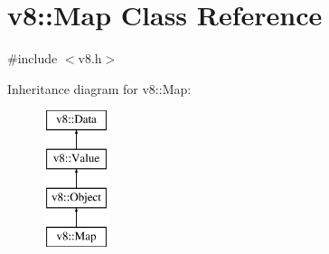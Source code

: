 \hypertarget{classv8_1_1Map}{}\section{v8\+:\+:Map Class Reference}
\label{classv8_1_1Map}


{\ttfamily \#include $<$v8.\+h$>$}

Inheritance diagram for v8\+:\+:Map\+:\begin{figure}[H]
\begin{center}
\leavevmode
\includegraphics[height=4.000000cm]{classv8_1_1Map}
\end{center}
\end{figure}
